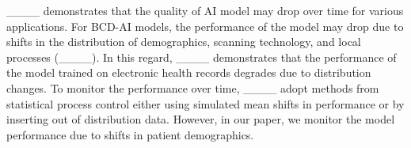 ____ demonstrates that the quality of AI model may drop over time for various applications. For BCD-AI models, the performance of the model may drop due to shifts in the distribution of demographics, scanning technology, and local processes (____). In this regard, ____ demonstrates that the performance of the model trained on electronic health records degrades due to distribution changes. To monitor the performance over time, ____ adopt methods from statistical process control either using simulated mean shifts in performance or by inserting out of distribution data. However, in our paper, we monitor the model performance due to shifts in patient demographics.